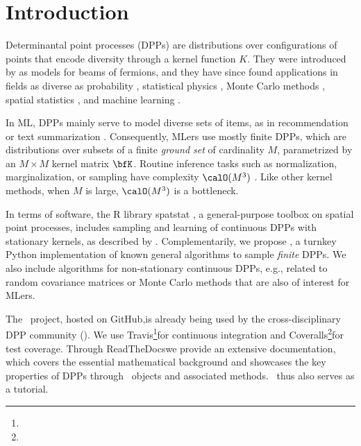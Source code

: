 \documentclass[twoside,11pt]{article}
\begin{document}
\vspace{-1em}

\section{Introduction} %
\label{sec:introduction}

    Determinantal point processes (DPPs) are distributions over configurations of points that encode diversity through a kernel function $K$.
    They were introduced by \citet{Mac75} as models for beams of fermions, and they have since found applications in fields as diverse as probability \citep{Sos00, Kon05, HKPV06}, statistical physics \citep{PaBe11}, Monte Carlo methods \citep{BaHa16}, spatial statistics \citep{LaMoRu15}, and machine learning \citep[ML,][]{KuTa12}.

    In ML, DPPs mainly serve to model diverse sets of items, as in recommendation \citep{KaDeKo16, GaPaKo16} or text summarization \citep{DuBa18}.
    Consequently, MLers  use mostly finite DPPs, which are distributions over subsets of a finite \emph{ground set} of cardinality $M$, parametrized by an $M\times M$ kernel matrix $\bfK$.
    Routine inference tasks such as normalization, marginalization, or sampling have complexity $\calO(M^3)$ \citep{Gil14}.
    Like other kernel methods, when $M$ is large, $\calO(M^3)$ is a bottleneck.

    In terms of software, the R library \textsf{spatstat} \citep{BaTu05}, a general-purpose toolbox on spatial point processes, includes sampling and learning of continuous DPPs with stationary kernels, as described by .
    Complementarily, we propose \DPPy, a turnkey Python implementation of known general algorithms to sample \emph{finite} DPPs.
    We also include algorithms for non-stationary continuous DPPs, e.g., related to random covariance matrices or Monte Carlo methods that are also of interest for MLers.

    The \DPPy\ project, hosted on GitHub,\!is already being used by the cross-disciplinary DPP community (\citealp{BuRaWi19,Kam18,Pou19,DeCaVa19,GaBaVa19}).
    We use Travis\!\footnote{\footTravis}for continuous integration and Coveralls\!\footnote{\footCoveralls}for test coverage.
    Through ReadTheDocswe provide an extensive documentation, which covers the essential mathematical background and showcases the key properties of DPPs through \DPPy\ objects and associated methods.
    \DPPy\ thus also serves as a tutorial.
\end{document}
